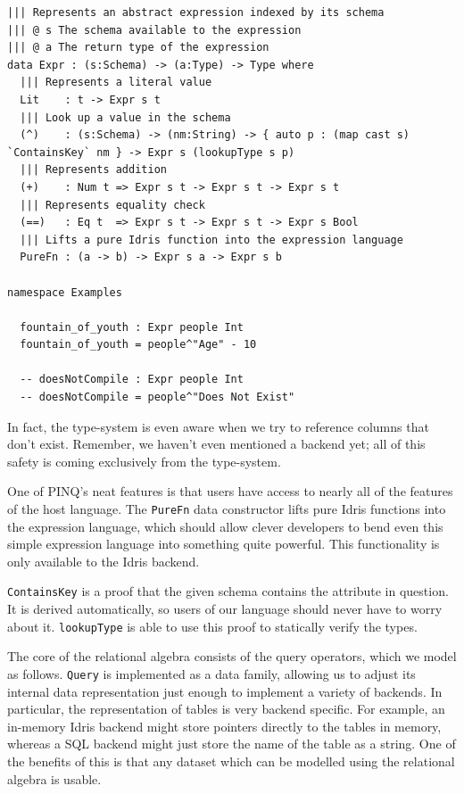 \documentclass[12pt]{article}
\begin{document}
\begin{lstlisting}[caption={Representing expressions},label={lst:expressions}]
||| Represents an abstract expression indexed by its schema
||| @ s The schema available to the expression
||| @ a The return type of the expression
data Expr : (s:Schema) -> (a:Type) -> Type where
  ||| Represents a literal value
  Lit    : t -> Expr s t
  ||| Look up a value in the schema
  (^)    : (s:Schema) -> (nm:String) -> { auto p : (map cast s) `ContainsKey` nm } -> Expr s (lookupType s p)
  ||| Represents addition
  (+)    : Num t => Expr s t -> Expr s t -> Expr s t
  ||| Represents equality check
  (==)   : Eq t  => Expr s t -> Expr s t -> Expr s Bool
  ||| Lifts a pure Idris function into the expression language
  PureFn : (a -> b) -> Expr s a -> Expr s b

namespace Examples

  fountain_of_youth : Expr people Int
  fountain_of_youth = people^"Age" - 10

  -- doesNotCompile : Expr people Int
  -- doesNotCompile = people^"Does Not Exist"
\end{lstlisting}

In fact, the type-system is even aware when we try to reference columns that don't exist.
Remember, we haven't even mentioned a backend yet; all of this safety is coming exclusively from the type-system.

One of PINQ's neat features is that users have access to nearly all of the features of the host language.
The \texttt{PureFn} data constructor lifts pure Idris functions into the expression language, which should allow clever developers to bend even this simple expression language into something quite powerful.
This functionality is only available to the Idris backend.

\texttt{ContainsKey} is a proof that the given schema contains the attribute in question.
It is derived automatically, so users of our language should never have to worry about it.
\texttt{lookupType} is able to use this proof to statically verify the types.

The core of the relational algebra consists of the query operators, which we model as follows.
\texttt{Query} is implemented as a data family, allowing us to adjust its internal data representation just enough to implement a variety of backends.
In particular, the representation of tables is very backend specific.
For example, an in-memory Idris backend might store pointers directly to the tables in memory, whereas a SQL backend might just store the name of the table as a string.
One of the benefits of this is that any dataset which can be modelled using the relational algebra is usable.
\end{document}

